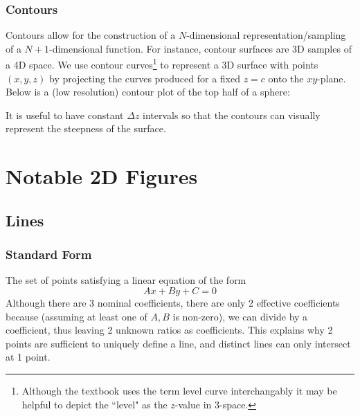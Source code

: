 \documentclass{article}
\begin{document}
\subsubsection{Contours}
Contours allow for the construction of a $N$-dimensional representation/sampling of a $N+1$-dimensional function. For instance, contour surfaces are 3D samples of a 4D space.
We use contour curves\footnote{Although the textbook uses the term level curve interchangably it may be helpful to depict the ``level" as the $z$-value in 3-space.} to represent a 3D surface with points $(x,y,z)$ by projecting the curves produced for a fixed $z=c$ onto the $xy$-plane. Below is a (low resolution) contour plot of the top half of a sphere:
\begin{center}
\end{center}
It is useful to have constant $\Delta z$ intervals so that the contours can visually represent the steepness of the surface.

\section{Notable 2D Figures}

\subsection{Lines}

\subsubsection{Standard Form} The set of points satisfying a linear equation of the form $$Ax + By + C = 0$$
Although there are 3 nominal coefficients, there are only 2 effective coefficients because (assuming at least one of $A,B$ is non-zero), we can divide by a coefficient, thus leaving 2 unknown ratios as coefficients. This explains why 2 points are sufficient to uniquely define a line, and distinct lines can only intersect at 1 point.
\end{document}
